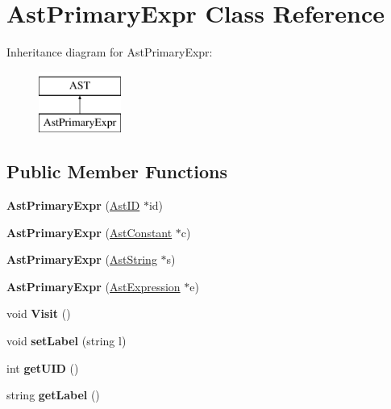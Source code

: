 \hypertarget{classAstPrimaryExpr}{\section{Ast\-Primary\-Expr Class Reference}
\label{classAstPrimaryExpr}
}
Inheritance diagram for Ast\-Primary\-Expr\-:\begin{figure}[H]
\begin{center}
\leavevmode
\includegraphics[height=2.000000cm]{classAstPrimaryExpr}
\end{center}
\end{figure}
\subsection*{Public Member Functions}
\begin{DoxyCompactItemize}
\item 
\hypertarget{classAstPrimaryExpr_a92ac6a98d42e522c7476768c959e2044}{{\bfseries Ast\-Primary\-Expr} (\hyperlink{classAstID}{Ast\-I\-D} $\ast$id)}\label{classAstPrimaryExpr_a92ac6a98d42e522c7476768c959e2044}

\item 
\hypertarget{classAstPrimaryExpr_a03809c945a11ab5345f50956cff84f82}{{\bfseries Ast\-Primary\-Expr} (\hyperlink{classAstConstant}{Ast\-Constant} $\ast$c)}\label{classAstPrimaryExpr_a03809c945a11ab5345f50956cff84f82}

\item 
\hypertarget{classAstPrimaryExpr_a784c92261d262fe4952963af0dd891e7}{{\bfseries Ast\-Primary\-Expr} (\hyperlink{classAstString}{Ast\-String} $\ast$s)}\label{classAstPrimaryExpr_a784c92261d262fe4952963af0dd891e7}

\item 
\hypertarget{classAstPrimaryExpr_a75b1363ac6a376ea3de63e03700072d8}{{\bfseries Ast\-Primary\-Expr} (\hyperlink{classAstExpression}{Ast\-Expression} $\ast$e)}\label{classAstPrimaryExpr_a75b1363ac6a376ea3de63e03700072d8}

\item 
\hypertarget{classAstPrimaryExpr_adfc316933183cada2963b7b855ddb824}{void {\bfseries Visit} ()}\label{classAstPrimaryExpr_adfc316933183cada2963b7b855ddb824}

\item 
\hypertarget{classAST_a71d680856e95ff89f55d5311a552eba6}{void {\bfseries set\-Label} (string l)}\label{classAST_a71d680856e95ff89f55d5311a552eba6}

\item 
\hypertarget{classAST_ab7a5b1d9f1c2de0d98deb356f724a42c}{int {\bfseries get\-U\-I\-D} ()}\label{classAST_ab7a5b1d9f1c2de0d98deb356f724a42c}

\item 
\hypertarget{classAST_aee029be902fffc927d16ccb03eb922ad}{string {\bfseries get\-Label} ()}\label{classAST_aee029be902fffc927d16ccb03eb922ad}

\end{DoxyCompactItemize}

